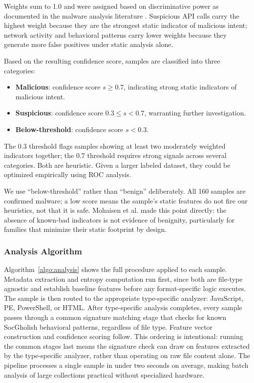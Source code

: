 \documentclass[pdflatex,sn-mathphys-num]{sn-jnl}
\theoremstyle{thmstyleone}%
\theoremstyle{thmstyletwo}%
\theoremstyle{thmstylethree}%
\begin{document}
\noindent Weights sum to 1.0 and were assigned based on discriminative power as documented in the malware analysis literature \cite{gandotra2014, ucci2019}. Suspicious API calls carry the highest weight because they are the strongest static indicator of malicious intent; network activity and behavioral patterns carry lower weights because they generate more false positives under static analysis alone.

Based on the resulting confidence score, samples are classified into three categories:

\begin{itemize}
    \item \textbf{Malicious}: confidence score $s \geq 0.7$, indicating strong static indicators of malicious intent.
    \item \textbf{Suspicious}: confidence score $0.3 \leq s < 0.7$, warranting further investigation.
    \item \textbf{Below-threshold}: confidence score $s < 0.3$.
\end{itemize}

\noindent The 0.3 threshold flags samples showing at least two moderately weighted indicators together; the 0.7 threshold requires strong signals across several categories. Both are heuristic. Given a larger labeled dataset, they could be optimized empirically using ROC analysis.

We use ``below-threshold'' rather than ``benign'' deliberately. All 160 samples are confirmed malware; a low score means the sample's static features do not fire our heuristics, not that it is safe. Mohaisen et al. \cite{mohaisen2015} made this point directly: the absence of known-bad indicators is not evidence of benignity, particularly for families that minimize their static footprint by design.

\subsubsection{Analysis Algorithm}\label{subsubsec:algorithm}

Algorithm~\ref{algo:analysis} shows the full procedure applied to each sample. Metadata extraction and entropy computation run first, since both are file-type agnostic and establish baseline features before any format-specific logic executes. The sample is then routed to the appropriate type-specific analyzer: JavaScript, PE, PowerShell, or HTML. After type-specific analysis completes, every sample passes through a common signature matching stage that checks for known SocGholish behavioral patterns, regardless of file type. Feature vector construction and confidence scoring follow. This ordering is intentional: running the common stages last means the signature check can draw on features extracted by the type-specific analyzer, rather than operating on raw file content alone. The pipeline processes a single sample in under two seconds on average, making batch analysis of large collections practical without specialized hardware.
\end{document}
